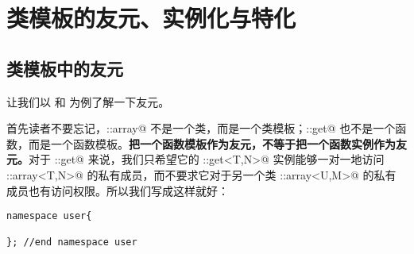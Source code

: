 \section{类模板的友元、实例化与特化}
\subsection*{类模板中的友元}
让我们以 \lstinline@get@ 和 \lstinline@swap@ 为例了解一下友元。\par
首先读者不要忘记，\lstinline@user::array@ 不是一个类，而是一个类模板；\lstinline@user::get@ 也不是一个函数，而是一个函数模板。\textbf{把一个函数模板作为友元，不等于把一个函数实例作为友元。}对于 \lstinline@user::get@ 来说，我们只希望它的 \lstinline@user::get<T,N>@ 实例能够一对一地访问 \lstinline@user::array<T,N>@ 的私有成员，而不要求它对于另一个类 \lstinline@user::array<U,M>@ 的私有成员也有访问权限。所以我们写成这样就好：
\begin{lstlisting}
namespace user{

}; //end namespace user
\end{lstlisting}